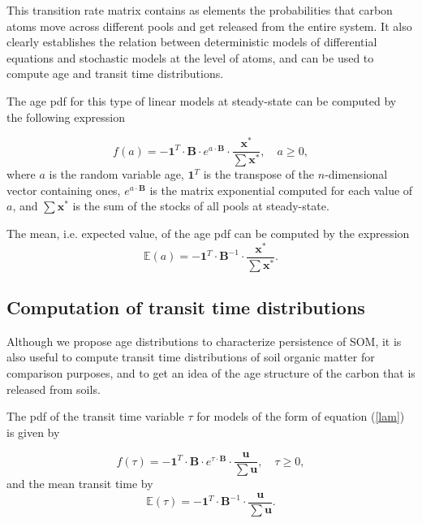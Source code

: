 \documentclass[draft,linenumbers]{agujournal}
\begin{document}
This transition rate matrix contains as elements the probabilities that carbon atoms move across different pools and get released from the entire system. It also clearly establishes the relation between deterministic models of differential equations and stochastic models at the level of atoms, and can be used to compute age and transit time distributions. 

The age pdf for this type of linear models at steady-state can be computed by the following expression \citep{Metzler2018MG}

\begin{equation} \label{agepdf}
f(a) = - \mathbf{1}^{T} \cdot \mathbf{B} \cdot e^{a \cdot \mathbf{B}} \cdot \frac{{\bm x}^{\ast}}{\sum {\bm x}^{\ast}}, \quad a \geq 0,
\end{equation}
where $a$ is the random variable age, $\mathbf{1}^{T}$ is the transpose of the $n$-dimensional vector containing ones, $e^{a \cdot \mathbf{B}}$ is the matrix exponential computed for each value of $a$, and $\sum{\bm x}^{\ast}$ is the sum of the stocks of all pools at steady-state. 

The mean, i.e. expected value, of the age pdf can be computed by the expression
\begin{equation} \label{meanage}
\mathbb{E}(a) = - \mathbf{1}^{T} \cdot \mathbf{B}^{-1} \cdot \frac{{\bm x}^{\ast}}{\sum {\bm x}^{\ast}}.
\end{equation}

\subsection{Computation of transit time distributions}
Although we propose age distributions to characterize persistence of SOM, it is also useful to compute transit time distributions of soil organic matter for comparison purposes, and to get an idea of the age structure of the carbon that is released from soils. 

The pdf of the transit time variable $\tau$ for models of the form of equation (\ref{lam}) is given by \citep{Metzler2018MG}

\begin{equation} \label{ttpdf}
f(\tau) = - \mathbf{1}^{T} \cdot \mathbf{B} \cdot e^{\tau \cdot \mathbf{B}} \cdot \frac{{\bm u}}{\sum {\bm u}}, \quad \tau \geq 0,
\end{equation}
and the mean transit time by
\begin{equation} \label{meantt}
\mathbb{E}(\tau) = - \mathbf{1}^{T} \cdot \mathbf{B}^{-1} \cdot \frac{{\bm u}}{\sum {\bm u}}.
\end{equation}
\end{document}
